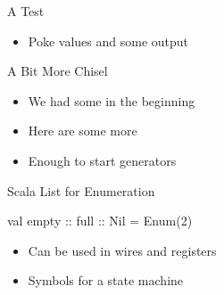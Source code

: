 \begin{frame}[fragile]{A Test}
\begin{itemize}
\item Poke values and  some output
\end{itemize}
\end{frame}

%

\begin{frame}{A Bit More Chisel}
\begin{itemize}
    \item We had some in the beginning
    \item Here are some more
    \item Enough to start generators
\end{itemize}
\end{frame}


\begin{frame}[fragile]{Scala List for Enumeration}
\begin{chisel}
  val empty :: full :: Nil = Enum(2)
\end{chisel}
\begin{itemize}
\item Can be used in wires and registers
\item Symbols for a state machine
\end{itemize}
\end{frame}

